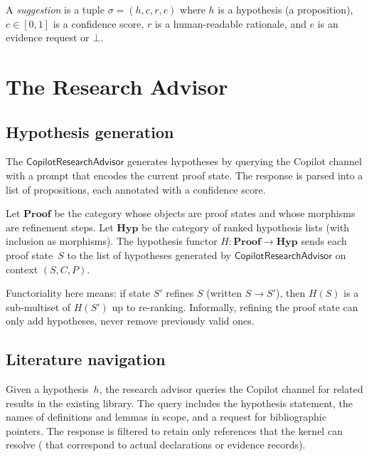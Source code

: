 \documentclass[11pt]{article}
\newcommand{\ResAdv}{\mathsf{CopilotResearchAdvisor}}
\begin{document}
\begin{definition}[Suggestion]\label{def:suggestion}
A \emph{suggestion} is a tuple
$\sigma = (h, c, r, e)$ where $h$ is a hypothesis
(a proposition), $c \in [0,1]$ is a confidence score,
$r$ is a human-readable rationale, and $e$ is an evidence
request or $\bot$.
\end{definition}

\section{The Research Advisor}\label{sec:research}

\subsection{Hypothesis generation}

The $\ResAdv$ generates hypotheses by querying the
Copilot channel with a prompt that encodes the current proof
state.  The response is parsed into a list of propositions,
each annotated with a confidence score.

\begin{definition}\label{def:hypfunctor}
Let $\mathbf{Proof}$ be the category whose objects are proof
states and whose morphisms are refinement steps.
Let $\mathbf{Hyp}$ be the category of ranked hypothesis lists
(with inclusion as morphisms).
The hypothesis functor $H \colon \mathbf{Proof} \to \mathbf{Hyp}$
sends each proof state~$S$ to the list of hypotheses generated
by $\ResAdv$ on context $(S, C, P)$.
\end{definition}

\begin{remark}
Functoriality here means: if state $S'$ refines $S$
(written $S \to S'$), then $H(S)$ is a sub-multiset of $H(S')$
up to re-ranking.  Informally, refining the proof state can
only add hypotheses, never remove previously valid ones.
\end{remark}

\subsection{Literature navigation}

Given a hypothesis~$h$, the research advisor queries the
Copilot channel for related results in the existing library.
The query includes the hypothesis statement, the names of
definitions and lemmas in scope, and a request for
bibliographic pointers.  The response is filtered to
retain only references that the kernel can resolve
(\ie{} that correspond to actual \LEAN{} declarations or
\JuGeo{} evidence records).
\end{document}
